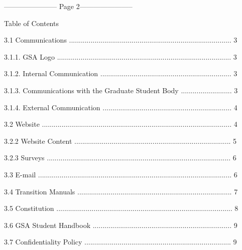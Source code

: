 ----------------------- Page 2-----------------------

                                            Table of Contents  

  

  3.1      Communications ................................................................................... 3  



   3.1.1.  GSA Logo ......................................................................................... 3  



   3.1.2.  Internal Communication ................................................................... 3  



   3.1.3.  Communications with the Graduate Student Body .......................... 3  



   3.1.4.  External Communication .................................................................. 4  



  3.2      Website ................................................................................................. 4  



   3.2.2   Website Content ................................................................................ 5  



   3.2.3   Surveys .............................................................................................. 6  



  3.3      E-mail ................................................................................................... 6  



  3.4      Transition Manuals ............................................................................... 7  



  3.5      Constitution .......................................................................................... 8  



  3.6      GSA Student Handbook ....................................................................... 9  



  3.7      Confidentiality Policy ........................................................................... 9  



